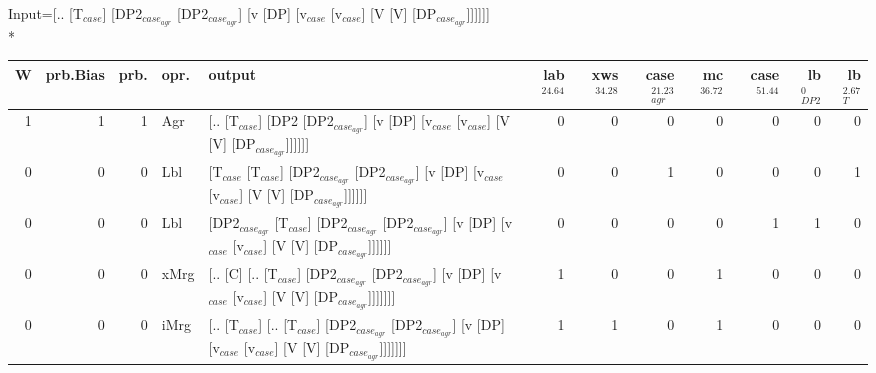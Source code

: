 \begingroup\scriptsize Input=[.. [T$_{case}$] [DP2$_{case_{agr}}$ [DP2$_{case_{agr}}$] [v [DP] [v$_{case}$ [v$_{case}$] [V [V] [DP$_{case_{agr}}$]]]]]]\\*
\begin{tabularx}{\linewidth}{rrrlXrrrrrrr}
\hline
   W &   prb.Bias &   prb. & opr.   & output                                                                                                                                                                           &   lab$^{24.64}$ &   xws$^{34.28}$ &   case$_{agr}^{21.23}$ &   mc$^{36.72}$ &   case$^{51.44}$ &   lb$_{DP2}^{0}$ &   lb$_{T}^{2.67}$ \\
\hline
   1 &       1 &   1 & Agr  & [.. [T$_{case}$] [DP2 [DP2$_{case_{agr}}$] [v [DP] [v$_{case}$ [v$_{case}$] [V [V] [DP$_{case_{agr}}$]]]]]]                                                                                              &             0 &             0 &                  0 &            0 &              0 &            0 &              0 \\
   0 &       0 &   0 & Lbl  & [T$_{case}$ [T$_{case}$] [DP2$_{case_{agr}}$ [DP2$_{case_{agr}}$] [v [DP] [v$_{case}$ [v$_{case}$] [V [V] [DP$_{case_{agr}}$]]]]]]                                                                                 &             0 &             0 &                  1 &            0 &              0 &            0 &              1 \\
   0 &       0 &   0 & Lbl  & [DP2$_{case_{agr}}$ [T$_{case}$] [DP2$_{case_{agr}}$ [DP2$_{case_{agr}}$] [v [DP] [v$_{case}$ [v$_{case}$] [V [V] [DP$_{case_{agr}}$]]]]]]                                                                           &             0 &             0 &                  0 &            0 &              1 &            1 &              0 \\
   0 &       0 &   0 & xMrg & [.. [C] [.. [T$_{case}$] [DP2$_{case_{agr}}$ [DP2$_{case_{agr}}$] [v [DP] [v$_{case}$ [v$_{case}$] [V [V] [DP$_{case_{agr}}$]]]]]]]                                                                            &             1 &             0 &                  0 &            1 &              0 &            0 &              0 \\
   0 &       0 &   0 & iMrg & [.. [T$_{case}$] [.. [T$_{case}$] [DP2$_{case_{agr}}$ [DP2$_{case_{agr}}$] [v [DP] [v$_{case}$ [v$_{case}$] [V [V] [DP$_{case_{agr}}$]]]]]]]                                                                       &             1 &             1 &                  0 &            1 &              0 &            0 &              0 \\

\end{tabularx}
